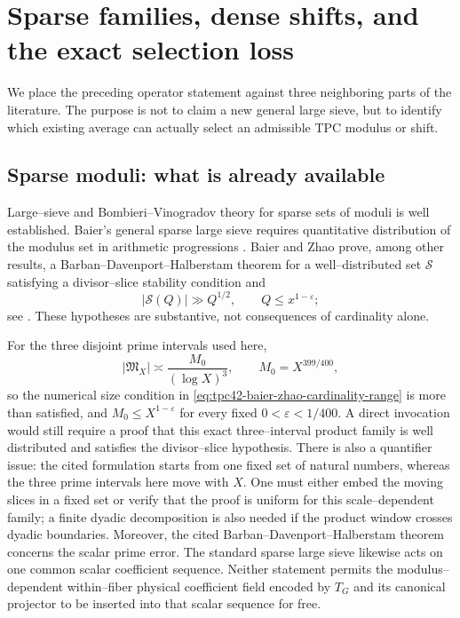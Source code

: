 \section{Sparse families, dense shifts, and the exact selection loss}
\label{sec:tpc42-literature-boundary}

We place the preceding operator statement against three neighboring
parts of the literature.  The purpose is not to claim a new general
large sieve, but to identify which existing average can actually select
an admissible TPC modulus or shift.

\subsection{Sparse moduli: what is already available}

Large--sieve and Bombieri--Vinogradov theory for sparse sets of moduli is
well established.  Baier's general sparse large sieve requires
quantitative distribution of the modulus set in arithmetic progressions
\citep{Baier2006SparseLargeSieve}.  Baier and Zhao prove, among other
results, a Barban--Davenport--Halberstam theorem for a well--distributed
set \(\mathcal S\) satisfying a divisor--slice stability condition and
\begin{equation}
 |\mathcal S(Q)|\gg Q^{1/2},
 \qquad Q\le x^{1-\varepsilon};
 \label{eq:tpc42-baier-zhao-cardinality-range}
\end{equation}
see \citet[Theorem~1]{BaierZhao2006}.  These hypotheses are substantive,
not consequences of cardinality alone.

For the three disjoint prime intervals used here,
\begin{equation}
 |\mathfrak M_X|
 \asymp\frac{M_0}{(\log X)^3},
 \qquad M_0=X^{399/400},
 \label{eq:tpc42-literature-family-density}
\end{equation}
so the numerical size condition in
\eqref{eq:tpc42-baier-zhao-cardinality-range} is more than satisfied,
and \(M_0\le X^{1-\varepsilon}\) for every fixed
\(0<\varepsilon<1/400\).  A direct invocation would still require a
proof that this exact three--interval product family is well distributed
and satisfies the divisor--slice hypothesis.  There is also a
quantifier issue: the cited formulation starts from one fixed set of
natural numbers, whereas the three prime intervals here move with \(X\).
One must either embed the moving slices in a fixed set or verify that the
proof is uniform for this scale--dependent family; a finite dyadic
decomposition is also needed if the product window crosses dyadic
boundaries.  Moreover, the cited
Barban--Davenport--Halberstam theorem concerns the scalar prime error.
The standard sparse large sieve likewise acts on one common scalar
coefficient sequence.  Neither statement permits the modulus--dependent
within--fiber physical coefficient field encoded by \(T_G\) and its
canonical projector to be inserted into that scalar sequence for free.

